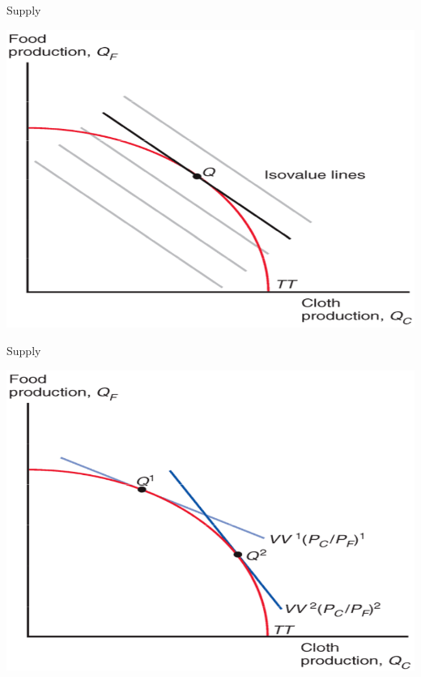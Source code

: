 \documentclass[ignorenonframetext,]{beamer}
\begin{document}
\begin{frame}{Supply}

    \includegraphics[scale=0.25]{isovalue.png}

\end{frame}

\begin{frame}{Supply}

    \includegraphics[scale=0.25]{price_supply.png}

\end{frame}
\end{document}
